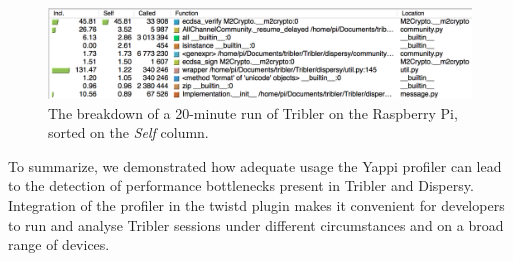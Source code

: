 \begin{figure}[!h]
	\centering
	\includegraphics[width=1.0\columnwidth]{images/experiments/yappi_breakdown_self}
	\caption{The breakdown of a 20-minute run of Tribler on the Raspberry Pi, sorted on the \emph{Self} column.}
	\label{fig:yappi_breakdown_self}
\end{figure}

To summarize, we demonstrated how adequate usage the Yappi profiler can lead to the detection of performance bottlenecks present in Tribler and Dispersy. Integration of the profiler in the twistd plugin makes it convenient for developers to run and analyse Tribler sessions under different circumstances and on a broad range of devices.

